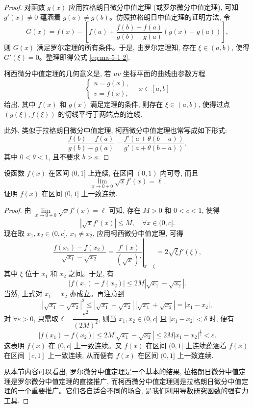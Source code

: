 \begin{proof}
对函数 $g(x)$ 应用拉格朗日微分中值定理 (或罗尔微分中值定理), 可知 $g'(x)\ne0$ 蕴涵着 $g(a)\ne g(b)$。仿照拉格朗日中值定理的证明方法, 令
\[
  G(x)=f(x)-\left[f(a)+\frac{f(b)-f(a)}{g(b)-g(a)}(g(x)-g(a))\right],
\]
则 $G(x)$ 满足罗尔定理的所有条件。于是, 由罗尔定理知, 存在 $\xi\in(a,b)$, 使得 $G'(\xi)=0$。整理即得公式 \eqref{eq:ma-5-1-2}.

柯西微分中值定理的几何意义是, 若 $uv$ 坐标平面的曲线由参数方程
\[
  \begin{cases}
    u=g(x),\\
    v=f(x),
  \end{cases}
  \quad x\in[a,b]
\]
给出, 其中 $f(x)$ 和 $g(x)$ 满足定理的条件, 则存在 $\xi\in(a,b)$, 使得过点 $(g(\xi),f(\xi))$ 的切线平行于两端点的连线.

此外, 类似于拉格朗日微分中值定理, 柯西微分中值定理也常写成如下形式:
\[
  \frac{f(b)-f(a)}{g(b)-g(a)}
  =
  \frac{f'(a+\theta(b-a))}{g'(a+\theta(b-a))},
\]
其中 $0<\theta<1$, 且不要求 $b>a$.
\end{proof}


\begin{example}\label{example:ma-5-1-7}
设函数 $f(x)$ 在区间 $(0,1]$ 上连续, 在区间 $(0,1)$ 内可导, 而且
\[
  \lim_{x\to0+0}\sqrt{x}f'(x)=\ell.
\]
证明 $f(x)$ 在区间 $(0,1]$ 上一致连续.
\end{example}


\begin{proof}
由 $\lim\limits_{x\to0+0}\sqrt{x}f'(x)=\ell$ 可知, 存在 $M>0$ 和 $0<c<1$, 使得
\[
  |\sqrt{x}f'(x)|\leqslant M,\quad \forall x\in(0,c].
\]
现在取 $x_1,x_2\in(0,c]$, $x_1\ne x_2$, 应用柯西微分中值定理, 可得
\[
  \frac{f(x_1)-f(x_2)}{\sqrt{x_1}-\sqrt{x_2}}
  =
  \left.\frac{f'(x)}{(\sqrt{x})'}\right|_{x=\xi}
  =
  2\sqrt{\xi}f'(\xi),
\]
其中 $\xi$ 位于 $x_1$ 和 $x_2$ 之间。于是, 有
\[
  |f(x_1)-f(x_2)|\leqslant 2M|\sqrt{x_1}-\sqrt{x_2}|.
\]
当然, 上式对 $x_1=x_2$ 亦成立。再注意到
\[
  |\sqrt{x_1}-\sqrt{x_2}|^2
  \leqslant |\sqrt{x_1}-\sqrt{x_2}|\,|\sqrt{x_1}+\sqrt{x_2}|
  =
  |x_1-x_2|,
\]
对 $\forall\varepsilon>0$, 只需取 $\delta=\dfrac{\varepsilon^2}{(2M)^2}$, 则当 $x_1,x_2\in(0,c]$ 且 $|x_1-x_2|<\delta$ 时, 便有
\[
  |f(x_1)-f(x_2)|
  \leqslant 2M|\sqrt{x_1}-\sqrt{x_2}|
  \leqslant 2M|x_1-x_2|^{\frac12}
  <\varepsilon.
\]
这表明 $f(x)$ 在 $(0,c]$ 上一致连续。又 $f(x)$ 在区间 $(0,1]$ 上连续蕴涵着 $f(x)$ 在区间 $[c,1]$ 上一致连续, 从而便有 $f(x)$ 在区间 $(0,1]$ 上一致连续.

从本节内容可以看出, 罗尔微分中值定理是一个基本的结果, 拉格朗日微分中值定理是罗尔微分中值定理的直接推广, 而柯西微分中值定理则是拉格朗日微分中值定理的一个重要推广。它们各自适合不同的场合, 是我们利用导数研究函数的强有力工具.
\end{proof}


